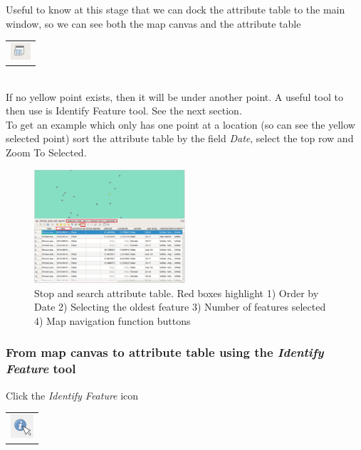 Useful to know at this stage that we can dock the attribute table to the main window, so we can see both the map canvas and the attribute table 
\begin{tabular}{@{}c@{}}\includegraphics[width=4ex]{images/dock_attribute_table_icon.png}\end{tabular}\\

If no yellow point exists, then it will be under another point.
A useful tool to then use is Identify Feature tool. See the next section.\\
\null\newpage
To get an example which only has one point at a location (so can see the yellow selected point) sort the attribute table by the field \textit{Date}, select the top row and Zoom To Selected.
\begin{figure}[!h]
	\centering
	\includegraphics[width=0.5\textwidth]{images/stop_search_one_row_selected_oldest_date_redbox_docked_at_table.png}%
	\caption{Stop and search attribute table. Red boxes highlight 1) Order by Date 2) Selecting the oldest feature 3) Number of features selected 4) Map navigation function buttons}
	\label{ft_fig_firstfig3}
\end{figure}


\subsubsection{From map canvas to attribute table using the \textit{Identify Feature} tool}

Click the \textit{Identify Feature} icon 
\begin{tabular}{@{}c@{}}\includegraphics[width=4ex]{images/identify_feature_icon.png}\end{tabular}

